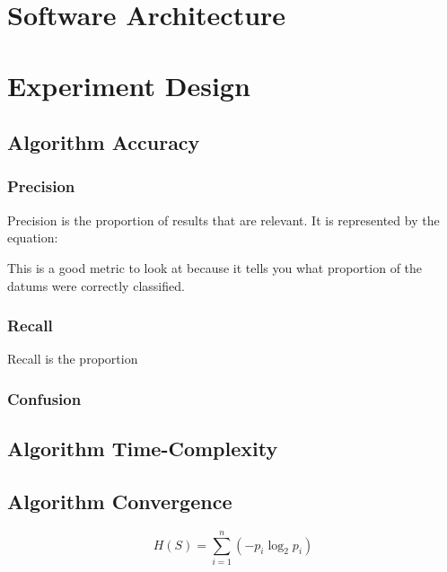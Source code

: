 \documentclass{article}
\begin{document}
		
		
		
		
	\section{Software Architecture}
	\section{Experiment Design}
		\subsection{Algorithm Accuracy}
			\subsubsection{Precision}
			Precision is the proportion of results that are relevant\cite{ai}. It is represented by the equation:
			
			This is a good metric to look at because it tells you what proportion of the datums were correctly classified. 
			\subsubsection{Recall}
			Recall is the proportion 
			\subsubsection{Confusion}
		\subsection{Algorithm Time-Complexity}
		\subsection{Algorithm Convergence}
			\label{convergence}

	\begin{equation*}
		H(S) = \sum_{i=1}^{n} \left( -p_i \log_2 p_i \right)
	\end{equation*}

		
	
\end{document}

